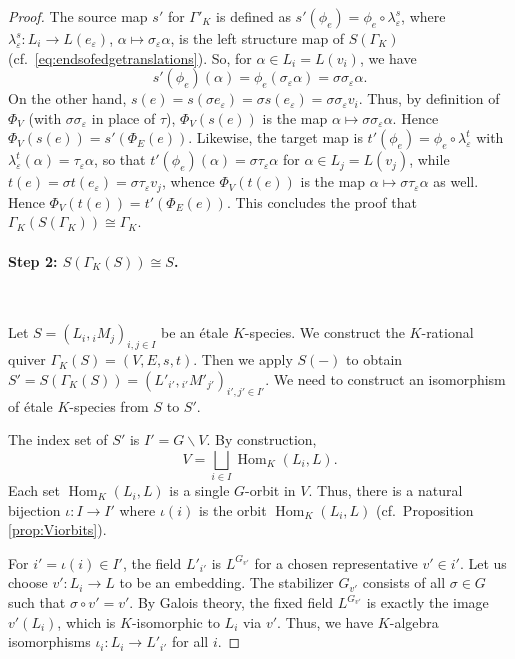 \documentclass[a4paper,12pt,reqno]{amsart}
\DeclareMathOperator{\Hom}{\mathrm{Hom}}
\theoremstyle{plain}
\theoremstyle{remark}
\begin{document}
\begin{proof}
    The source map $s'$ for $\Gamma'_K$ is defined as $s'(\phi_e) = \phi_e \circ \lambda^s_\varepsilon$, where $\lambda^s_\varepsilon\colon L_i \to L(e_\varepsilon)$, $\alpha\mapsto\sigma_\varepsilon\alpha$, is the left structure map of $S(\Gamma_K)$ (cf.\ \eqref{eq:endsofedgetranslations}). So, for $\alpha\in L_i = L(v_i)$, we have
    \[
    s'(\phi_e)(\alpha) = \phi_e(\sigma_\varepsilon\alpha) = \sigma\sigma_\varepsilon \alpha.
    \]
    On the other hand, $s(e) = s(\sigma e_\varepsilon)=\sigma s(e_\varepsilon)=\sigma\sigma_\varepsilon v_i$. Thus, by definition of $\Phi_V$ (with $\sigma\sigma_\varepsilon$ in place of $\tau$), $\Phi_V(s(e))$ is the map $\alpha \mapsto \sigma\sigma_\varepsilon \alpha$. Hence $\Phi_V(s(e)) = s'(\Phi_E(e))$. Likewise, the target map is $t'(\phi_e)=\phi_e\circ\lambda^t_\varepsilon$ with $\lambda^t_\varepsilon(\alpha)=\tau_\varepsilon\alpha$, so that $t'(\phi_e)(\alpha)=\sigma\tau_\varepsilon\alpha$ for $\alpha\in L_j=L(v_j)$, while $t(e)=\sigma t(e_\varepsilon)=\sigma\tau_\varepsilon v_j$, whence $\Phi_V(t(e))$ is the map $\alpha\mapsto\sigma\tau_\varepsilon\alpha$ as well. Hence $\Phi_V(t(e)) = t'(\Phi_E(e))$. This concludes the proof that $\Gamma_K(S(\Gamma_K))\cong \Gamma_K$.

    \paragraph{Step 2: $S(\Gamma_K(S)) \cong S$.}\ 

    \smallskip
Let $S=(L_i, {}_iM_j)_{i,j\in I}$ be an \'etale $K$-species. We construct the $K$-rational quiver $\Gamma_K(S)=(V,E,s,t)$. Then we apply $S(-)$ to obtain $S' = S(\Gamma_K(S))=(L'_{i'},{}_{i'}M'_{j'})_{i',j'\in I'}$. We need to construct an isomorphism of \'etale $K$-species from $S$ to $S'$.

    \smallskip
     The index set of $S'$ is $I' = G\backslash V$. By construction,
    \[
    V=\bigsqcup\limits_{i\in I}\Hom_K(L_i,L).
    \]
    Each set $\Hom_K(L_i,L)$ is a single $G$-orbit in $V$. Thus, there is a natural bijection $\iota\colon I \to I'$ where $\iota(i)$ is the orbit $\Hom_K(L_i,L)$ (cf.\ Proposition \ref{prop:Viorbits}).

    \smallskip
     For $i'=\iota(i)\in I'$, the field $L'_{i'}$ is $L^{G_{v'}}$ for a chosen representative $v' \in i'$. Let us choose $v'\colon L_i \to L$ to be an embedding. The stabilizer $G_{v'}$ consists of all $\sigma\in G$ such that $\sigma\circ v' = v'$. By Galois theory, the fixed field $L^{G_{v'}}$ is exactly the image $v'(L_i)$, which is $K$-isomorphic to $L_i$ via $v'$. Thus, we have $K$-algebra isomorphisms $\iota_i\colon L_i \to L'_{i'}$ for all $i$.


\end{proof}
\end{document}
